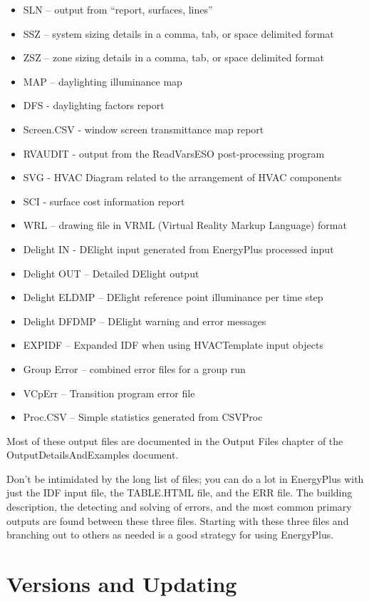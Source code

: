 \begin{itemize}
\item SLN -- output from \textquotedblleft report, surfaces, lines\textquotedblright{}
\item SSZ -- system sizing details in a comma, tab, or space delimited
format
\item ZSZ -- zone sizing details in a comma, tab, or space delimited format
\item MAP -- daylighting illuminance map
\item DFS - daylighting factors report
\item Screen.CSV - window screen transmittance map report
\item RVAUDIT - output from the ReadVarsESO post-processing program
\item SVG - HVAC Diagram related to the arrangement of HVAC components
\item SCI - surface cost information report
\item WRL -- drawing file in VRML (Virtual Reality Markup Language) format
\item Delight IN - DElight input generated from EnergyPlus processed input
\item Delight OUT -- Detailed DElight output
\item Delight ELDMP -- DElight reference point illuminance per time step
\item Delight DFDMP -- DElight warning and error messages
\item EXPIDF -- Expanded IDF when using HVACTemplate input objects
\item Group Error -- combined error files for a group run
\item VCpErr -- Transition program error file
\item Proc.CSV -- Simple statistics generated from CSVProc
\end{itemize}
Most of these output files are documented in the Output Files chapter
of the OutputDetailsAndExamples document.

Don't be intimidated by the long list of files; you can do a lot in
EnergyPlus with just the IDF input file, the TABLE.HTML file, and
the ERR file. The building description, the detecting and solving
of errors, and the most common primary outputs are found between these
three files. Starting with these three files and branching out to
others as needed is a good strategy for using EnergyPlus.

\section{Versions and Updating}

